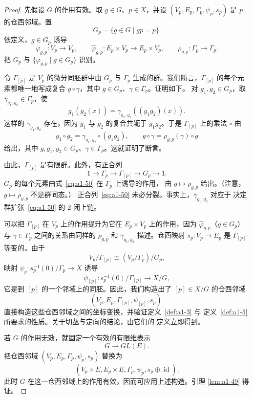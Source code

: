 \begin{proof}
先假设 $G$ 的作用有效。取 $g\in G$、$p\in X$，并设
$(V_p,E_p,\Gamma_p,\psi_p,s_p)$ 是 $p$ 的仓西邻域。置
\[
 G_p=\{g\in G\mid gp=p\}.
\]
依定义，$g\in G_p$ 诱导
\[
 \varphi_{g,p}\colon V_p\longrightarrow V_p,
 \qquad
 \widehat\varphi_{g,p}\colon E_p\times V_p
     \longrightarrow E_p\times V_p,
 \qquad
 \rho_{g,p}\colon\Gamma_p\longrightarrow\Gamma_p.
\]
把 $G_p$ 与 $\{\varphi_{g,p}\mid g\in G_p\}$ 识别。

令 $\Gamma_{[p]}$ 是 $V_p$ 的微分同胚群中由 $G_p$ 与 $\Gamma_p$
生成的群。我们断言，$\Gamma_{[p]}$ 的每个元素都唯一地写成复合
$g\circ\gamma$，其中 $g\in G_p$、$\gamma\in\Gamma_p$。证明如下。
对 $g_1,g_2\in G_p$，取 $\gamma_{g_1,g_2}\in\Gamma_p$，使
\[
 g_1(g_2(x))=\gamma_{g_1,g_2}((g_1g_2)(x)).
\]
这样的 $\gamma_{g_1,g_2}$ 存在，因为 $g_1$ 与 $g_2$ 的复合共轭于
$g_1g_2$。于是 $\Gamma_{[p]}$ 上的乘法 $\circ$ 由
\[
 g_1\circ g_2=\gamma_{g_1,g_2}\circ(g_1g_2),
 \qquad
 g\circ\gamma=\rho_{g,p}(\gamma)\circ g
\]
给出，其中 $g,g_1,g_2\in G_p$、$\gamma\in\Gamma_p$。这就证明了断言。

由此，$\Gamma_{[p]}$ 是有限群。此外，有正合列
\begin{equation}
 1\longrightarrow\Gamma_p\longrightarrow\Gamma_{[p]}
 \longrightarrow G_p\longrightarrow1.
\tag{A1.50}\label{eq:a1-50}
\end{equation}
$G_p$ 的每个元素由式~\eqref{eq:a1-50} 在 $\Gamma_p$ 上诱导的作用，
由 $g\mapsto\rho_{g,p}$ 给出。（注意，$g\mapsto\rho_{g,p}$ 不是群同态。）
正合列~\eqref{eq:a1-50} 未必分裂。事实上，$\gamma_{g_1,g_2}$ 对应于
决定群扩张~\eqref{eq:a1-50} 的 $2$-闭上链。

可以把 $\Gamma_{[p]}$ 在 $V_p$ 上的作用提升为它在
$E_p\times V_p$ 上的作用，因为 $\widehat\varphi_{g,p}$（$g\in G_p$）
与 $\gamma\in\Gamma_p$ 之间的关系由同样的 $\rho_{g,p}$ 和
$\gamma_{g_1,g_2}$ 描述。仓西映射 $s_p\colon V_p\to E_p$ 是
$\Gamma_{[p]}$-等变的。由于
\[
 V_p/\Gamma_{[p]}\cong(V_p/\Gamma_p)/G_p,
\]
映射 $\psi_p\colon s_p^{-1}(0)/\Gamma_p\to X$ 诱导
\[
 \psi_{[p]}\colon s_p^{-1}(0)/\Gamma_{[p]}\longrightarrow X/G,
\]
它是到 $[p]$ 的一个邻域上的同胚。因此，我们构造出了
$[p]\in X/G$ 的仓西邻域
\[
 (V_p,E_p,\Gamma_{[p]},\psi_{[p]},s_p).
\]
直接构造这些仓西邻域之间的坐标变换，并验证定义~\ref{def:a1-3} 与
定义~\ref{def:a1-5} 所要求的性质。关于切丛与定向的结论，由它们的
定义立即得到。

若 $G$ 的作用无效，就固定一个有效的有限维表示
\[
 G\longrightarrow GL(E).
\]
把仓西邻域 $(V_p,E_p,\Gamma_p,\psi_p,s_p)$ 替换为
\[
 (V_p\times E,E_p\times E,\Gamma_p,\psi_p,s_p\oplus\operatorname{id}).
\]
此时 $G$ 在这一仓西邻域上的作用有效，因而可应用上述构造。引理
\ref{lem:a1-49} 得证。
\end{proof}

